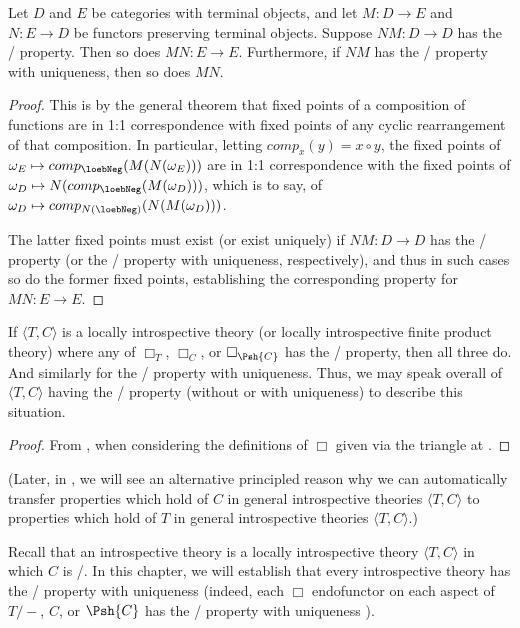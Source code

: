 \begin{theorem}\label{LoebTransfer}
Let $D$ and $E$ be categories with terminal objects, and let $M : D \to E$ and $N : E \to D$ be functors preserving terminal objects. Suppose $NM : D \to D$ has the \Loeb/ property. Then so does $MN : E \to E$. Furthermore, if $NM$ has the \Loeb/ property with uniqueness, then so does $MN$.
\end{theorem}
\begin{proof}
This is by the general theorem  that fixed points of a composition of functions are in 1:1 correspondence with fixed points of any cyclic rearrangement of that composition. In particular, letting $comp_x(y) = x \circ y$, the fixed points of $\omega_E \mapsto comp_{\loebNeg}(M(N(\omega_E)))$ are in 1:1 correspondence with the fixed points of $\omega_D \mapsto N (comp_{{\loebNeg}}(M(\omega_D)))$, which is to say, of $\omega_D \mapsto comp_{N({\loebNeg})}(N (M (\omega_D)))$.

The latter fixed points must exist (or exist uniquely) if $NM : D \to D$ has the \Loeb/ property (or the \Loeb/ property with uniqueness, respectively), and thus in such cases so do the former fixed points, establishing the corresponding property for $MN : E \to E$.
\end{proof}

\begin{corollary}\label{LoebTransferIntrosp}
If $\langle T, C \rangle$ is a locally introspective theory (or locally introspective finite product theory) where any of $\Box_T$, $\Box_C$, or $\Box_{\Psh{C}}$ has the \Loeb/ property, then all three do. And similarly for the \Loeb/ property with uniqueness. Thus, we may speak overall of $\langle T, C \rangle$ having the \Loeb/ property (without or with uniqueness) to describe this situation.
\end{corollary}
\begin{proof}
From , when considering the definitions of $\Box$ given via the triangle at .
\end{proof}

(Later, in , we will see an alternative principled reason why we can automatically transfer properties which hold of $C$ in general introspective theories $\langle T, C \rangle$ to properties which hold of $T$ in general introspective theories $\langle T, C \rangle$.)

Recall that an introspective theory is a locally introspective theory $\langle T, C \rangle$ in which $C$ is \repsmall/. In this chapter, we will establish that every introspective theory has the \Loeb/ property with uniqueness (indeed, each $\Box$ endofunctor on each aspect of $T/-$, $C$, or $\Psh{C}$ has the \Loeb/ property with uniqueness ).

